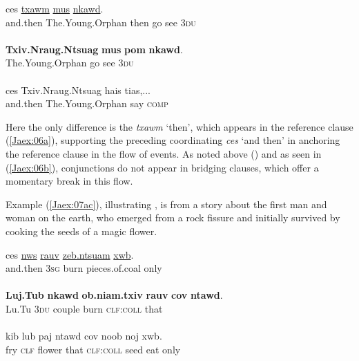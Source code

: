 \documentclass[output=paper]{LSP/langsci}
\begin{document}
\begin{exe}
\ex \label{Jaex:06ac}
\begin{xlist}
\ex \label{Jaex:06a}
\gll ces  \underline{} \underline{txawm} \underline{mus} \underline{} \underline{nkawd}.\\
and.then The.Young.Orphan then go see \textsc{3du}\\
\glt {}\\
\ex \label{Jaex:06b}
\gll \textbf{Txiv.Nraug.Ntsuag} \textbf{mus} \textbf{pom} \textbf{nkawd}.\\
The.Young.Orphan go see \textsc{3du}\\
\glt {}\\
\ex \label{Jaex:06c}
\gll ces Txiv.Nraug.Ntsuag hais tias,...\\     	      
     and.then The.Young.Orphan say \textsc{comp}\\
\glt {} \citep[][161]{johnson92}
\end{xlist}
\end{exe}

\noindent
Here the only difference is the   \textit{txawm } `then', which appears in the reference clause (\ref{Jaex:06a}), supporting the preceding coordinating  \textit{ces} `and then' in anchoring the reference clause in the  flow of events. As noted above () and as seen in (\ref{Jaex:06b}),  conjunctions do not appear in bridging clauses, which offer a momentary break in this  flow.


Example (\ref{Jaex:07ac}), illustrating , is from a story about the first man and woman on the earth, who emerged from a rock fissure and initially survived by cooking the seeds of a magic flower.


\begin{exe}
\ex \label{Jaex:07ac}
\begin{xlist}
\ex \label{Jaex:07a}
\gll ces  \underline{nws} \underline{rauv} \underline{zeb.ntsuam} \underline{xwb}.\\
and.then \textsc{3sg} burn pieces.of.coal only\\
\glt {}\\
\ex \label{Jaex:07b}
\gll \textbf{Luj.Tub} \textbf{nkawd} \textbf{ob.niam.txiv} \textbf{rauv} \textbf{cov}  \textbf{ntawd}.\\
Lu.Tu \textsc{3du} couple burn \textsc{clf:coll} that\\
\glt {}\\
\ex \label{Jaex:07c}
\gll kib lub paj ntawd cov noob noj xwb.\\     	      
     fry \textsc{clf} flower that  \textsc{clf:coll} seed eat only\\
\glt {} \citep[][3]{johnson92}
\end{xlist}
\end{exe}
\end{document}
